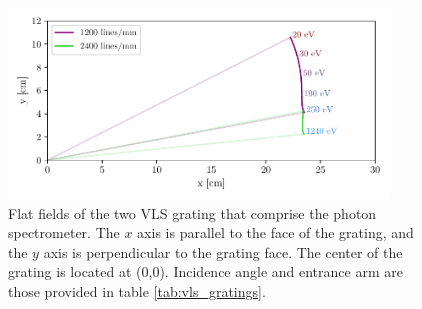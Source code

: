 \begin{figure}
	\centering
	\includegraphics[width=0.9\textwidth]{figures/Beamline/VLS_flat_field.pdf}
	\caption[Flat field of VLS gratings]{Flat fields of the two VLS grating that comprise the photon spectrometer.  The $x$ axis is parallel to the face of the grating, and the $y$ axis is perpendicular to the grating face.  The center of the grating is located at (0,0).  Incidence angle and entrance arm are those provided in table \ref{tab:vls_gratings}.}
	\label{fig:VLS_flat_field}
\end{figure}




